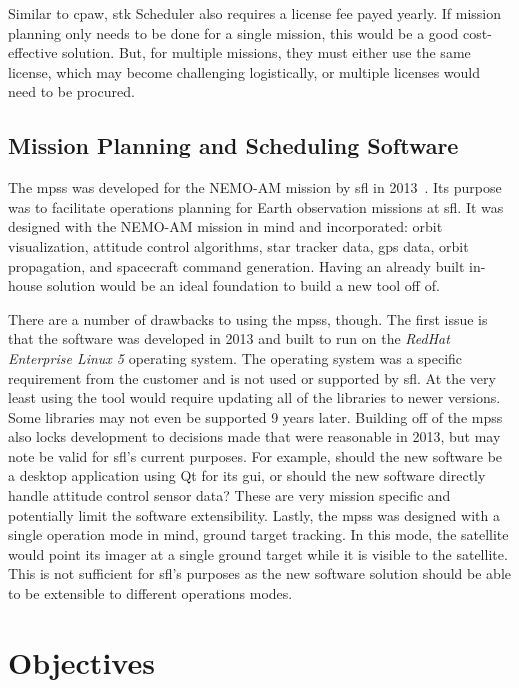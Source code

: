 Similar to \gls{cpaw}, \gls{stk} Scheduler also requires a license fee payed
yearly. If mission planning only needs to be done for a single mission, this
would be a good cost-effective solution. But, for multiple missions, they must
either use the same license, which may become challenging logistically, or
multiple licenses would need to be procured.


\subsection{Mission Planning and Scheduling Software}

The \gls{mpss} was developed for the NEMO-AM mission by \gls{sfl} in
2013~\cite{mehradnia_design_2013}.  Its purpose was to facilitate operations
planning for Earth observation missions at \gls{sfl}. It was designed with the
NEMO-AM mission in mind and incorporated: orbit visualization, attitude control
algorithms, star tracker data, \gls{gps} data, orbit propagation, and
spacecraft command generation.  Having an already built in-house solution would
be an ideal foundation to build a new tool off of. 

There are a number of drawbacks to using the \gls{mpss}, though. The first
issue is that the software was developed in 2013 and built to run on the
\textit{RedHat Enterprise Linux 5} operating system. The operating system was a
specific requirement from the customer and is not used or supported by
\gls{sfl}. At the very least using the tool would require updating all of the
libraries to newer versions. Some libraries may not even be supported 9 years
later. Building off of the \gls{mpss} also locks development to decisions made
that were reasonable in 2013, but may note be valid for \gls{sfl}'s current
purposes.  For example, should the new software be a desktop application using
Qt for its \gls{gui}, or should the new software directly handle attitude
control sensor data? These are very mission specific and potentially limit the
software extensibility. Lastly, the \gls{mpss} was designed with a single
operation mode in mind, ground target tracking. In this mode, the satellite
would point its imager at a single ground target while it is visible to the
satellite. This is not sufficient for \gls{sfl}'s purposes as the new software
solution should be able to be extensible to different operations modes.    


\section{Objectives}

